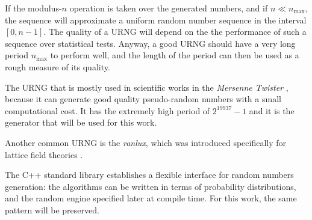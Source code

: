 If the modulus-$n$ operation is taken over the generated numbers, and if $n\ll n_\mathrm{max}$,
the sequence will approximate a uniform random number sequence in the interval $[0,n-1]$.
The quality of a URNG will depend on the the performance of such a sequence over statistical tests.
Anyway, a good URNG should have a very long period $n_\mathrm{max}$ to perform well,
and the length of the period can then be used as a rough measure of its quality.

The URNG that is mostly used in scientific works in the \emph{Mersenne Twister} \cite{mersenne-twister},
because it can generate good quality pseudo-random numbers with a small computational cost.
It has the extremely high period of $2^{19937}-1$ and it is the generator that will be used for this work.

Another common URNG is the \emph{ranlux}, which was introduced specifically for lattice field theories \cite{ranlux}.

The C++ standard library establishes a flexible interface for random numbers generation:
the algorithms can be written in terms of probability distributions,
and the random engine specified later at compile time.
For this work, the same pattern will be preserved.

